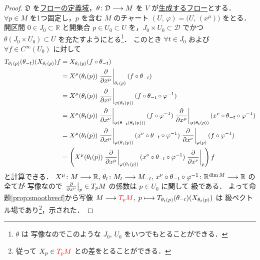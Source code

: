 \documentclass[TQFT_main]{subfiles}
\begin{document}
\begin{proof}
    $\mathfrak{D}$ を\hyperref[def:local-flow]{フローの定義域}，$\theta \colon \mathcal{D} \longrightarrow M$ を $V$ が\hyperref[thm:fundamental-flow]{生成するフロー}とする．
    $\forall p \in M$ を1つ固定し，$p$ を含む $M$ のチャート $(U,\, \varphi) = \bigl( U,\, (x^\mu) \bigr) $ をとる．
    開区間 $0 \in J_0 \subset \mathbb{R}$ と開集合 $p \in U_0 \subset U$ を，$J_0 \times U_0 \subset \mathcal{D}$ でかつ $\theta (J_0 \times U_0) \subset U$ を充たすようにとる\footnote{$\theta$ は \cinfty 写像なのでこのような $J_0,\, U_0$ をいつでもとることができる．}．
    このとき $\forall t \in J_0$ および $\forall f \in C^\infty(U_0)$ に対して
    \begin{align}
        T_{\theta_t(p)}(\theta_{-t})(X_{\theta_t(p)}) f
        &= X_{\theta_t(p)} (f \circ \theta_{-t}) \\
        &= X^\mu (\theta_t(p)) \eval{\pdv{}{x^\mu}}_{\theta_t(p)} (f \circ \theta_{-t}) \\
        &= X^\mu (\theta_t(p)) \eval{\pdv{}{x^\mu}}_{\varphi(\theta_t(p))} (f \circ \theta_{-t} \circ \varphi^{-1}) \\
        &= X^\mu (\theta_t(p)) \eval{\pdv{}{x^\nu}}_{\varphi(\theta_{-t}(\theta_t(p)))} (f \circ \varphi^{-1}) \eval{\pdv{}{x^\mu}}_{\varphi(\theta_t(p))}(x^\nu \circ \theta_{-t} \circ \varphi^{-1}) \\
        &= X^\mu (\theta_t(p)) \eval{\pdv{}{x^\mu}}_{\varphi(\theta_t(p))}(x^\nu \circ \theta_{-t} \circ \varphi^{-1}) \eval{\pdv{}{x^\nu}}_{\varphi(p)} (f \circ \varphi^{-1}) \\
        &= \left(X^\mu (\theta_t(p)) \eval{\pdv{}{x^\mu}}_{\varphi(\theta_t(p))}(x^\nu \circ \theta_{-t} \circ \varphi^{-1}) \eval{\pdv{}{x^\nu}}_{p}\right) f
    \end{align}
    と計算できる．
    $X^\mu \colon M \longrightarrow \mathbb{R},\, \theta_t \colon M_t \longrightarrow M_{-t},\, x^\nu \circ \theta_{-t} \circ \varphi^{-1} \colon \mathbb{R}^{\dim M} \longrightarrow \mathbb{R}$ の全てが \cinfty 写像なので $\eval{\pdv{}{x^\nu}}_{p} \in T_p M$ の係数は $p \in U_0$ に関して \cinfty 級である．
    よって命題\ref{prop:smoothvecf}から写像 $M \longrightarrow \textcolor{red}{T_p M},\; p \longmapsto T_{\theta_t(p)}(\theta_{-t})(X_{\theta_t(p)})$ は \cinfty 級ベクトル場であり\footnote{従って $X_p \in \textcolor{red}{T_p M}$ との差をとることができる．}，示された．
\end{proof}
\end{document}
